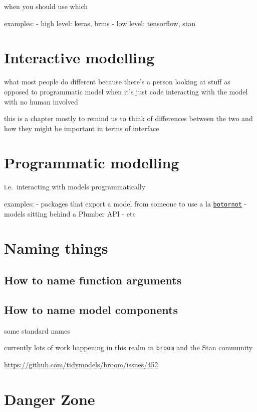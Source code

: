 \documentclass[]{book}
\theoremstyle{definition}
\theoremstyle{definition}
\theoremstyle{definition}
\theoremstyle{remark}
\begin{document}
when you should use which

examples: - high level: keras, brms - low level: tensorflow, stan

\chapter{Interactive modelling}\label{interactive-modelling}

what most people do different because there's a person looking at stuff
as opposed to programmatic model when it's just code interacting with
the model with no human involved

this is a chapter mostly to remind us to think of differences between
the two and how they might be important in terms of interface

\chapter{Programmatic modelling}\label{programmatic-modelling}

i.e.~interacting with models programmatically

examples: - packages that export a model from someone to use a la
\href{https://github.com/mkearney/tweetbotornot}{\texttt{botornot}} -
models sitting behind a Plumber API - etc

\chapter{Naming things}\label{naming-things}

\section{How to name function
arguments}\label{how-to-name-function-arguments}

\section{How to name model
components}\label{how-to-name-model-components}

some standard names

currently lots of work happening in this realm in \texttt{broom} and the
Stan community

\url{https://github.com/tidymodels/broom/issues/452}

\chapter{Danger Zone}\label{danger-zone}
\end{document}
